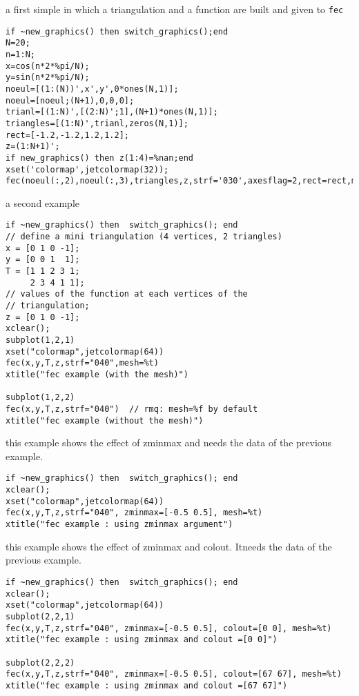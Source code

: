\begin{examples}

\noindent a first simple in which a triangulation and a function are
built and given to \verb!fec!
\begin{Verbatim}
if ~new_graphics() then switch_graphics();end
N=20;
n=1:N;
x=cos(n*2*%pi/N);
y=sin(n*2*%pi/N);
noeul=[(1:(N))',x',y',0*ones(N,1)];
noeul=[noeul;(N+1),0,0,0];
trianl=[(1:N)',[(2:N)';1],(N+1)*ones(N,1)];
triangles=[(1:N)',trianl,zeros(N,1)];
rect=[-1.2,-1.2,1.2,1.2];
z=(1:N+1)';
if new_graphics() then z(1:4)=%nan;end
xset('colormap',jetcolormap(32));
fec(noeul(:,2),noeul(:,3),triangles,z,strf='030',axesflag=2,rect=rect,mesh=%t);
\end{Verbatim}

\noindent a second example

\begin{Verbatim}
if ~new_graphics() then  switch_graphics(); end
// define a mini triangulation (4 vertices, 2 triangles)
x = [0 1 0 -1];
y = [0 0 1  1];
T = [1 1 2 3 1;
     2 3 4 1 1];
// values of the function at each vertices of the
// triangulation;
z = [0 1 0 -1];
xclear();
subplot(1,2,1)
xset("colormap",jetcolormap(64))
fec(x,y,T,z,strf="040",mesh=%t)
xtitle("fec example (with the mesh)")

subplot(1,2,2)
fec(x,y,T,z,strf="040")  // rmq: mesh=%f by default
xtitle("fec example (without the mesh)")
\end{Verbatim}

\noindent this example shows the effect of zminmax
and needs the data of the previous example.

\begin{Verbatim}
if ~new_graphics() then  switch_graphics(); end
xclear();
xset("colormap",jetcolormap(64))
fec(x,y,T,z,strf="040", zminmax=[-0.5 0.5], mesh=%t)
xtitle("fec example : using zminmax argument")
\end{Verbatim}

\noindent this example shows the effect of zminmax
and colout. Itneeds the data of the previous example.

\begin{Verbatim}
if ~new_graphics() then  switch_graphics(); end
xclear();
xset("colormap",jetcolormap(64))
subplot(2,2,1)
fec(x,y,T,z,strf="040", zminmax=[-0.5 0.5], colout=[0 0], mesh=%t)
xtitle("fec example : using zminmax and colout =[0 0]")

subplot(2,2,2)
fec(x,y,T,z,strf="040", zminmax=[-0.5 0.5], colout=[67 67], mesh=%t)
xtitle("fec example : using zminmax and colout =[67 67]")


\end{Verbatim}
\end{examples}
